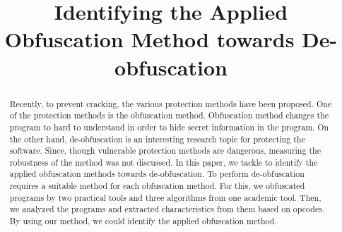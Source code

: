 \documentclass[conference]{IEEEtran}
\begin{document}
\title{Identifying the Applied Obfuscation Method towards De-obfuscation}

\author{
\and
{}
}

\maketitle

\begin{abstract}
  Recently, to prevent cracking, the various protection methods have
  been proposed.  One of the protection methods is the obfuscation
  method. Obfuscation method changes the program to hard to understand
  in order to hide secret information in the program.
  On the other hand, de-obfuscation is an interesting research topic
  for protecting the software.  Since, though vulnerable protection
  methods are dangerous, measuring the robustness of the method was not
  discussed.
  In this paper, we tackle to identify the applied obfuscation
  methods towards de-obfuscation.  To perform de-obfuscation requires
  a suitable method for each obfuscation method.  For this, we
  obfuscated programs by two practical tools and three algorithms
  from one academic tool.  Then, we analyzed the programs and
  extracted characteristics from them based on opcodes.  By using our
  method, we could identify the applied obfuscation method.

\end{abstract}
\end{document}
